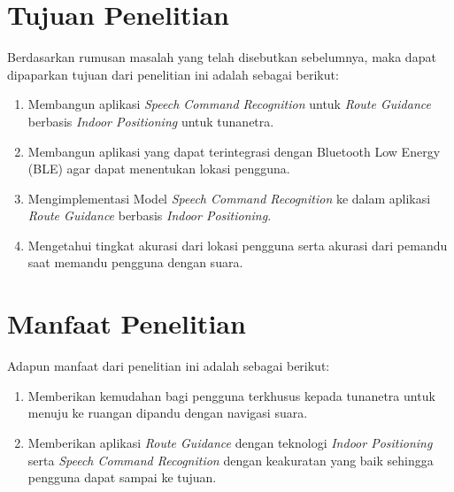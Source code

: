 \section{Tujuan Penelitian}
Berdasarkan rumusan masalah yang telah disebutkan sebelumnya, maka dapat dipaparkan tujuan dari penelitian ini adalah sebagai berikut: 
\begin{enumerate}
	\item Membangun aplikasi \textit{Speech Command Recognition} untuk \textit{Route Guidance} berbasis \textit{Indoor Positioning} untuk tunanetra.
	\item Membangun aplikasi yang dapat terintegrasi dengan Bluetooth Low Energy (BLE) agar dapat menentukan lokasi pengguna.
	\item Mengimplementasi Model \textit{Speech Command Recognition} ke dalam aplikasi \textit{Route Guidance} berbasis \textit{Indoor Positioning}.
	\item Mengetahui tingkat akurasi dari lokasi pengguna serta akurasi dari pemandu saat memandu pengguna dengan suara.
\end{enumerate}


\section{Manfaat Penelitian}
Adapun manfaat dari penelitian ini adalah sebagai berikut:
\begin{enumerate}
	\item Memberikan kemudahan bagi pengguna terkhusus kepada tunanetra untuk menuju ke ruangan dipandu dengan navigasi suara.
	\item Memberikan aplikasi \textit{Route Guidance} dengan teknologi \textit{Indoor Positioning} serta \textit{Speech Command Recognition} dengan keakuratan yang baik sehingga pengguna dapat sampai ke tujuan.
\end{enumerate}

\begin{comment}

\end{comment}